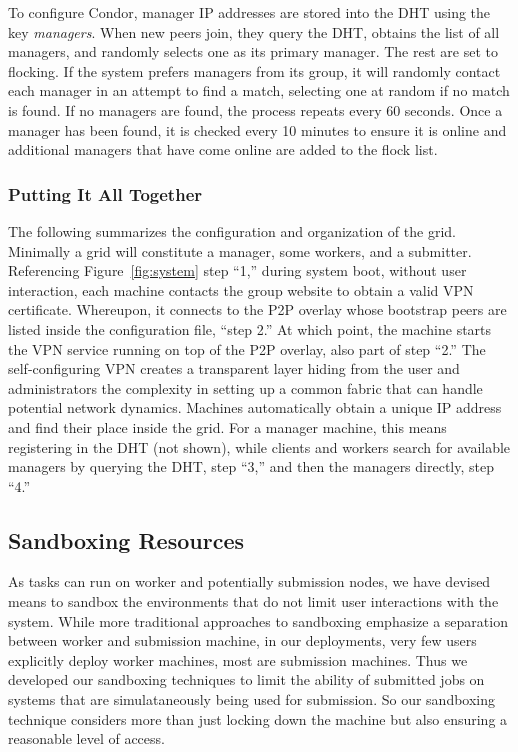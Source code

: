 \documentclass[conference]{IEEEtran}
\begin{document}
To configure Condor, manager IP addresses are stored into the DHT using the key
\emph{managers}.  When new peers join, they query the DHT, obtains the list of
all managers, and randomly selects one as its primary manager.  The rest are
set to flocking.  If the system prefers managers from its group, it will
randomly contact each manager in an attempt to find a match, selecting one at
random if no match is found.  If no managers are found, the process repeats
every 60 seconds.  Once a manager has been found, it is checked every 10
minutes to ensure it is online and additional managers that have come online
are added to the flock list.

\subsubsection{Putting It All Together}

The following summarizes the configuration and organization of the grid.
Minimally a grid will constitute a manager, some workers, and a submitter.
Referencing Figure~\ref{fig:system} step ``1,'' during system boot, without
user interaction, each machine contacts the group website to obtain a valid VPN
certificate.  Whereupon, it connects to the P2P overlay whose bootstrap peers
are listed inside the configuration file, ``step 2.''  At which point, the
machine starts the VPN service running on top of the P2P overlay, also part of
step ``2.'' The self-configuring VPN creates a transparent layer hiding from
the user and administrators the complexity in setting up a common fabric that
can handle potential network dynamics.  Machines automatically obtain a unique
IP address and find their place inside the grid.  For a manager machine, this
means registering in the DHT (not shown), while clients and workers search for
available managers by querying the DHT, step ``3,'' and then the managers
directly, step ``4.''  

\subsection{Sandboxing Resources}

As tasks can run on worker and potentially submission nodes, we have devised
means to sandbox the environments that do not limit user interactions with the
system.  While more traditional approaches to sandboxing emphasize a separation
between worker and submission machine, in our deployments, very few users
explicitly deploy worker machines, most are submission machines.  Thus we
developed our sandboxing techniques to limit the ability of submitted jobs on
systems that are simulataneously being used for submission.  So our sandboxing
technique considers more than just locking down the machine but also ensuring a
reasonable level of access.
\end{document}
